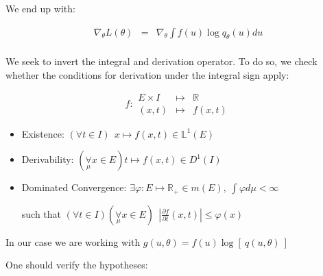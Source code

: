 \bigskip

We end up with:


$$
\begin{array}{lcl}
\nabla_\theta L(\theta) &=& \nabla_\theta \displaystyle\int f(u) \log q_\theta(u) du
\\
\end{array}
$$

\bigskip

We seek to invert the integral and derivation operator. To do so, we check whether the conditions for derivation under the integral sign apply:


$$
f : \begin{array}{ccc}
E\times I&\mapsto& \mathbb R
\\
(x,t) &\mapsto& f(x,t)
\end{array}
$$





\begin{itemize}
    \item Existence:
        $(\forall t \in I) \ \ x \mapsto f(x,t) \in \mathbb L^1(E)$
    \item Derivability: 
        $(\underset{\mu}{\forall} x \in E) t \mapsto f(x,t) \in D^1(I)$
    \item Dominated Convergence: $\exists \varphi : E \mapsto \mathbb R_+ \in m(E), 
\ \int \varphi d\mu  < \infty$

such that $(\forall t \in I)(\underset \mu \forall x \in E) \ \ \left|\frac{\partial f}{\partial t}(x,t)\right| \leq \varphi(x)$
\end{itemize}

\bigskip


In our case we are working with $g(u, \theta) = f(u) \log\left[ \ q(u, \theta) \ \right]$

\bigskip

One should verify the hypotheses:

\bigskip

